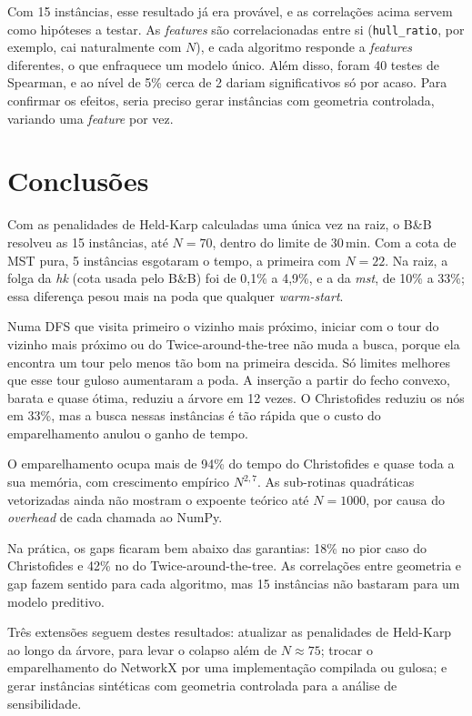 \documentclass[12pt]{article}
\begin{document}
Com 15 instâncias, esse resultado já era provável, e as correlações acima servem como
hipóteses a testar. As \textit{features} são correlacionadas entre si
(\texttt{hull\_ratio}, por exemplo, cai naturalmente com $N$), e cada algoritmo responde
a \textit{features} diferentes, o que enfraquece um modelo único. Além disso, foram 40
testes de Spearman, e ao nível de 5\% cerca de 2 dariam significativos só por acaso.
Para confirmar os efeitos, seria preciso gerar instâncias com geometria controlada,
variando uma \textit{feature} por vez.

\section{Conclusões}\label{sec:concl}

Com as penalidades de Held-Karp calculadas uma única vez na raiz, o B\&B resolveu as 15
instâncias, até $N=70$, dentro do limite de 30\,min. Com a cota de MST pura, 5
instâncias esgotaram o tempo, a primeira com $N=22$. Na raiz, a folga da \textit{hk} (cota usada pelo B\&B) foi de 0,1\% a 4,9\%, e a da \textit{mst}, de 10\% a 33\%; essa diferença pesou mais
na poda que qualquer \textit{warm-start}.

Numa DFS que visita primeiro o vizinho mais próximo, iniciar com o tour do vizinho mais
próximo ou do Twice-around-the-tree não muda a busca, porque ela encontra um tour pelo
menos tão bom na primeira descida. Só limites melhores que esse tour guloso aumentaram a
poda. A inserção a partir do fecho convexo, barata e quase ótima, reduziu a árvore em
12 vezes. O Christofides reduziu os nós em 33\%, mas a busca nessas instâncias é tão
rápida que o custo do emparelhamento anulou o ganho de tempo.

O emparelhamento ocupa mais de 94\% do tempo do Christofides e quase toda a sua memória,
com crescimento empírico $N^{2,7}$. As sub-rotinas quadráticas vetorizadas ainda não
mostram o expoente teórico até $N=1000$, por causa do \textit{overhead} de cada chamada
ao NumPy.

Na prática, os gaps ficaram bem abaixo das garantias: 18\% no pior caso do Christofides
e 42\% no do Twice-around-the-tree. As correlações entre geometria e gap fazem sentido
para cada algoritmo, mas 15 instâncias não bastaram para um modelo preditivo.

Três extensões seguem destes resultados: atualizar as penalidades de Held-Karp ao longo
da árvore, para levar o colapso além de $N \approx 75$; trocar o emparelhamento do
NetworkX por uma implementação compilada ou gulosa; e gerar instâncias sintéticas com
geometria controlada para a análise de sensibilidade.



\end{document}
